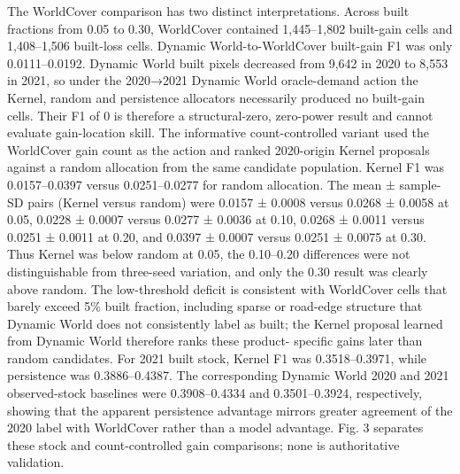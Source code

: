 The WorldCover comparison has two distinct interpretations. Across built
fractions from 0.05 to 0.30, WorldCover contained 1,445--1,802
built-gain cells and 1,408--1,506 built-loss cells. Dynamic
World-to-WorldCover built-gain F1 was only 0.0111--0.0192. Dynamic World
built pixels decreased from 9,642 in 2020 to 8,553 in 2021, so under the
2020→2021 Dynamic World oracle-demand action the Kernel, random and
persistence allocators necessarily produced no built-gain cells. Their
F1 of 0 is therefore a structural-zero, zero-power result and cannot
evaluate gain-location skill. The informative count-controlled variant
used the WorldCover gain count as the action and ranked 2020-origin
Kernel proposals against a random allocation from the same candidate
population. Kernel F1 was 0.0157--0.0397 versus 0.0251--0.0277 for
random allocation. The mean ± sample-SD pairs (Kernel versus random)
were 0.0157 ± 0.0008 versus 0.0268 ± 0.0058 at 0.05, 0.0228 ± 0.0007
versus 0.0277 ± 0.0036 at 0.10, 0.0268 ± 0.0011 versus 0.0251 ± 0.0011
at 0.20, and 0.0397 ± 0.0007 versus 0.0251 ± 0.0075 at 0.30. Thus Kernel
was below random at 0.05, the 0.10--0.20 differences were not
distinguishable from three-seed variation, and only the 0.30 result was
clearly above random. The low-threshold deficit is consistent with
WorldCover cells that barely exceed 5\% built fraction, including sparse
or road-edge structure that Dynamic World does not consistently label as
built; the Kernel proposal learned from Dynamic World therefore ranks
these product- specific gains later than random candidates. For 2021
built stock, Kernel F1 was 0.3518--0.3971, while persistence was
0.3886--0.4387. The corresponding Dynamic World 2020 and 2021
observed-stock baselines were 0.3908--0.4334 and 0.3501--0.3924,
respectively, showing that the apparent persistence advantage mirrors
greater agreement of the 2020 label with WorldCover rather than a model
advantage. Fig. 3 separates these stock and count-controlled gain
comparisons; none is authoritative validation.

